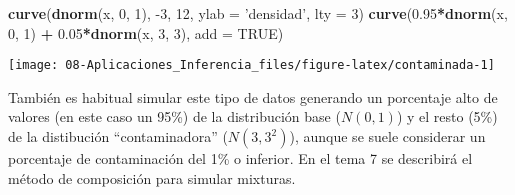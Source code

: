 \documentclass[
]{book}
\newenvironment{Shaded}{\begin{snugshade}}{\end{snugshade}}
\newcommand{\DataTypeTok}[1]{\textcolor[rgb]{0.13,0.29,0.53}{#1}}
\newcommand{\DecValTok}[1]{\textcolor[rgb]{0.00,0.00,0.81}{#1}}
\newcommand{\FloatTok}[1]{\textcolor[rgb]{0.00,0.00,0.81}{#1}}
\newcommand{\KeywordTok}[1]{\textcolor[rgb]{0.13,0.29,0.53}{\textbf{#1}}}
\newcommand{\NormalTok}[1]{#1}
\newcommand{\OperatorTok}[1]{\textcolor[rgb]{0.81,0.36,0.00}{\textbf{#1}}}
\newcommand{\OtherTok}[1]{\textcolor[rgb]{0.56,0.35,0.01}{#1}}
\newcommand{\StringTok}[1]{\textcolor[rgb]{0.31,0.60,0.02}{#1}}
\theoremstyle{break}
\theoremstyle{definition}
\theoremstyle{definition}
\theoremstyle{definition}
\theoremstyle{remark}
\let\BeginKnitrBlock\begin \let\EndKnitrBlock\end
\begin{document}
\begin{Shaded}
\begin{Highlighting}[]
\KeywordTok{curve}\NormalTok{(}\KeywordTok{dnorm}\NormalTok{(x, }\DecValTok{0}\NormalTok{, }\DecValTok{1}\NormalTok{), }\DecValTok{-3}\NormalTok{, }\DecValTok{12}\NormalTok{, }\DataTypeTok{ylab =} \StringTok{'densidad'}\NormalTok{, }\DataTypeTok{lty =} \DecValTok{3}\NormalTok{)}
\KeywordTok{curve}\NormalTok{(}\FloatTok{0.95}\OperatorTok{*}\KeywordTok{dnorm}\NormalTok{(x, }\DecValTok{0}\NormalTok{, }\DecValTok{1}\NormalTok{) }\OperatorTok{+}\StringTok{ }\FloatTok{0.05}\OperatorTok{*}\KeywordTok{dnorm}\NormalTok{(x, }\DecValTok{3}\NormalTok{, }\DecValTok{3}\NormalTok{), }\DataTypeTok{add =} \OtherTok{TRUE}\NormalTok{)}
\end{Highlighting}
\end{Shaded}

\begin{center}\texttt{[image: 08-Aplicaciones\_Inferencia\_files/figure-latex/contaminada-1]} \end{center}

\BeginKnitrBlock{remark}
\iffalse{} {Nota: } \fi{}También es habitual simular este tipo de datos generando un porcentaje alto de valores (en este caso un 95\%) de la distribución base (\(N(0,1)\)) y el resto (5\%) de la distibución ``contaminadora'' (\(N(3,3^2)\)), aunque se suele considerar un porcentaje de contaminación del 1\% o inferior. En el tema 7 se describirá el método de composición para simular mixturas.
\EndKnitrBlock{remark}

\vspace{0.5cm}
\end{document}
